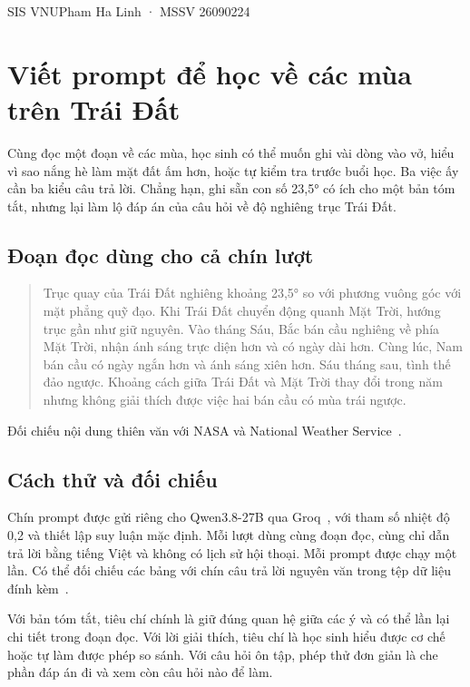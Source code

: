 \documentclass[12pt,a4paper]{article}
\begin{document}
{\large SIS VNU}\hfill Pham Ha Linh · MSSV 26090224

\section*{Viết prompt để học về các mùa trên Trái Đất}
Cùng đọc một đoạn về các mùa, học sinh có thể muốn ghi vài dòng vào vở, hiểu vì sao nắng hè làm mặt đất ấm hơn, hoặc tự kiểm tra trước buổi học. Ba việc ấy cần ba kiểu câu trả lời. Chẳng hạn, ghi sẵn con số 23,5° có ích cho một bản tóm tắt, nhưng lại làm lộ đáp án của câu hỏi về độ nghiêng trục Trái Đất.

\subsection*{Đoạn đọc dùng cho cả chín lượt}
\begin{quote}Trục quay của Trái Đất nghiêng khoảng 23,5° so với phương vuông góc với mặt phẳng quỹ đạo. Khi Trái Đất chuyển động quanh Mặt Trời, hướng trục gần như giữ nguyên. Vào tháng Sáu, Bắc bán cầu nghiêng về phía Mặt Trời, nhận ánh sáng trực diện hơn và có ngày dài hơn. Cùng lúc, Nam bán cầu có ngày ngắn hơn và ánh sáng xiên hơn. Sáu tháng sau, tình thế đảo ngược. Khoảng cách giữa Trái Đất và Mặt Trời thay đổi trong năm nhưng không giải thích được việc hai bán cầu có mùa trái ngược.\end{quote} Đối chiếu nội dung thiên văn với NASA và National Weather Service~\cite{nasa,nws}.
\subsection*{Cách thử và đối chiếu}
Chín prompt được gửi riêng cho Qwen3.8-27B qua Groq~\cite{groq}, với tham số nhiệt độ 0,2 và thiết lập suy luận mặc định. Mỗi lượt dùng cùng đoạn đọc, cùng chỉ dẫn trả lời bằng tiếng Việt và không có lịch sử hội thoại. Mỗi prompt được chạy một lần. Có thể đối chiếu các bảng với chín câu trả lời nguyên văn trong tệp dữ liệu đính kèm~\cite{log}.

Với bản tóm tắt, tiêu chí chính là giữ đúng quan hệ giữa các ý và có thể lần lại chi tiết trong đoạn đọc. Với lời giải thích, tiêu chí là học sinh hiểu được cơ chế hoặc tự làm được phép so sánh. Với câu hỏi ôn tập, phép thử đơn giản là che phần đáp án đi và xem còn câu hỏi nào để làm.
\end{document}
